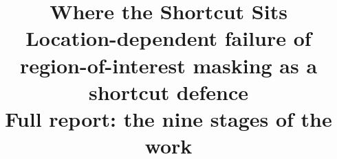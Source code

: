 

\pagestyle{fancy}\fancyhf{}\lfoot{\small\leftmark}\rfoot{\small\thepage}
\newcommand{\notY}{1 = melanoma (dermoscopy), malignant nodule (thyroid), tumour with a solid component (ovary), erosion (capsule), pneumothorax or finding (chest radiograph)}
\newcommand{\notA}{ruler, hair, sonographer caliper, capsule debris, chest tube, device or drain --- synthetic (pasted at a controlled position) or real}
\newcommand{\notROI}{lesion, nodule, tumour, union of expert lesion boxes, lungs}
\newcommand{\notCross}{$[\text{mask}-\text{ERM}]_{\text{outside}}-[\text{mask}-\text{ERM}]_{\text{inside}}$ of reversed-test AUROC: in the controlled sweeps and the transplant the \emph{location interaction} on the same images; in the real traps Trap~B $-$ Trap~A.}
\newcommand{\notCI}{95\% crossed seed$\times$image bootstrap interval (Section~\ref{sec:stage1}); analyses whose per-image predictions were not saved are shown as point estimates and marked ``not re-estimated''.}
\newcommand{\notExtra}{SMD & standardised mean difference of a covariate between two groups ($|$SMD$|>0.1$: imbalanced). \\
Hard pairs & positive--negative pairs whose artifact status conflicts with the test set's own artifact--label association. \\
OP1--OP5 & thresholds fixed on validation data: maximal balanced accuracy; specificity $\ge0.80$, $\ge0.90$; sensitivity $\ge0.80$, $\ge0.90$. \\
U-MtE & mask-then-erase: ROI masking followed by erasure of the feature subspace along which generic synthetic overlays move masked images. \\
min(rev, corr) & robustness summary: the lower of reversed and correlated AUROC ($^\dagger$: the arm flips the shortcut). \\}
\title{\textbf{Where the Shortcut Sits}\\[4pt]\Large Location-dependent failure of region-of-interest masking as a shortcut defence\\[4pt]\large Full report: the nine stages of the work}
\author{}
\date{}

